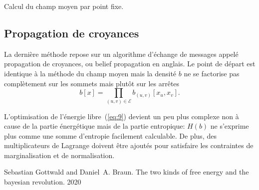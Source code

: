 \documentclass[a4paper,11pt,oneside]{article}
\begin{document}
\begin{algorithm}
  \caption{Calcul du champ moyen par point fixe.}
  \label{alg:3}
\end{algorithm}



\subsection{Propagation de croyances}
\label{sec:bp}

La dernière méthode repose sur un algorithme d'échange de
messages appelé propagation de croyances, ou
\textenglish{belief propagation} en anglais. Le point de
départ est identique à la méthode du champ moyen mais la
densité $b$ ne se factorise pas complètement sur les sommets
mais plutôt sur les arrêtes
\begin{equation}
  \label{eq:15}
  b[x] = \prod_{(u,v)\in\mathcal E} b_{(u,v)}[x_u, x_v].
\end{equation}

L'optimisation de l'énergie libre~(\ref{eq:9}) devient un
peu plus complexe non à cause de la partie énergétique mais
de la partie entropique: $H(b)$ ne s'exprime plus comme une
somme d'entropie facilement calculable. De plus, des
multiplicateurs de Lagrange doivent être ajoutés pour
satisfaire les contraintes de marginalisation et de
normalisation.

% 
% 
\begin{thebibliography}{GB}
 Sebastian Gottwald and Daniel~A. Braun.
  \newblock The two kinds of free energy and the bayesian
  revolution. 2020
\end{thebibliography}
\end{document}
